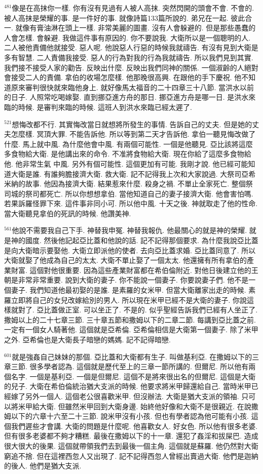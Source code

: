 \documentclass{book}
\begin{document}
$^{481}$像是在高抹你一樣.
你有沒有見過有人被人高抹.
突然閃開的頭會不會.
不會的.
被人高抹是榮耀的事.
是一件好的事.
就像詩篇133篇所說的.
弟兄在一起.
彼此合一.
就像有膏油淋在頭上一樣.
非常美麗的圖畫.
沒有人會躲避的.
但是那些愚蠢的人會怎樣.
會躲避.
我做這件事有原因的.
你不要說我.
大衛所以是一個聰明的人.
二人被他責備他就接受.
惡人呢.
他說惡人行惡的時候我就禱告.
有沒有見到大衛是多有智慧.
二人責備我接受.
惡人的行為對我的行為我就禱告.
所以我們見到其實.
我們接不接受人家的勸告.
反映出什麼.
反映出我們同神的關係.
一個淑齡的人絕對會接受二人的責備.
拿伯的收場怎麼樣.
他那晚很高興.
在跟他的手下慶祝.
他不知道原來審判很快就來臨他身上.
就好像馬太福音的二十四章三十八節.
當洪水以前的日子.
人照常吃喝嫁娶.
直到挪亞進方舟的那日.
挪亞進方舟是哪一日.
是洪水來臨的時候.
是審判來臨的時候.
這班人到洪水來臨已經太遲了.

$^{521}$想悔改都不行.
其實悔改當日就想將所發生的事情.
告訴自己的丈夫.
但是她的丈夫怎麼樣.
冥頂大罪.
不能告訴他.
所以等到第二天才告訴他.
拿伯一聽見悔改做了什麼.
馬上就中風.
為什麼他會中風.
有兩個可能性.
一個是他聽見.
亞比該將這麼多食物給大衛.
是他講出來的命令.
不准將食物給大衛.
現在你給了這麼多食物給他.
他非常生氣 中風.
另外有個可能性.
這個更加有可能.
我剛才說.
他已經可能知道大衛是誰.
有誰夠膽接濟大衛.
救大衛.
記不記得我上次和大家說過.
大祭司亞希米納的故事.
他因為接濟大衛.
結果惹來什麼.
殺身之禍.
不單止全家死亡.
整個祭司城的祭司都死亡.
所以你想想拿伯.
當他知道自己的妻子接濟大衛.
他會害怕嗎.
若果訴羅怪罪下來.
這件事非同小可.
所以他中風.
十天之後.
神就取走了他的性命.
當大衛聽見拿伯的死訊的時候.
他讚美神.

$^{561}$他說不需要我自己下手.
神替我申冤.
神替我報仇.
他最關心的就是神的榮耀.
就是神的國度.
然後他記起亞比蓋和他說的話.
記不記得那個要求.
為什麼我說亞比蓋是向大衛暗示要娶他.
大衛立即派他的使者.
去向亞比蓋求婚.
亞比蓋同意了.
所以大衛就娶了他成為自己的太太.
大衛不單止娶了一個太太.
他還擁有所有拿伯的產業財富.
這個對他很重要.
因為這些產業財富都在希伯倫附近.
對他日後建立他的王朝是非常非常重要.
說到大衛的妻子.
你不能說一個妻子.
你要說妻子們.
他不是一個妻子.
我們知道他最初娶的是誰.
是素羅的女米甲.
但當大衛離家出走的時候.
素羅立即將自己的女兒改嫁給別的男人.
所以現在米甲已經不是大衛的妻子.
你說這樣就對了.
亞比蓋做正室.
可以坐正了.
不是的.
似乎聖經告訴我們已經有人坐正了.
撒姆以上的二十七章三節.
三十章五節和撒姆以下的二章二節.
每講到亞比蓋之前.
一定有一個女人騎著他.
這個就是亞希倫.
亞希倫相信是大衛第一個妻子.
除了米甲之外.
亞希倫也是大衛長子暗戀的媽媽.
記不記得暗戀.

$^{601}$就是強姦自己妹妹的那個.
亞比蓋和大衛都有生子.
叫做基利亞.
在撒姆以下的三章三節.
很多學者認為.
這個就是歷代至上的三章一節所講的.
但爾尼.
所以他有兩個名字.
一個是基利亞.
一個是但爾尼.
這個不是將來很出名的但爾尼.
這個是大衛的兒子.
大衛在希伯倫統治猶大支派的時候.
他要求將米甲歸還給自己.
當時米甲已經嫁了另外一個人.
這個老公很喜歡米甲.
但沒辦法.
大衛是猶大支派的領袖.
只可以將米甲給大衛.
但雖然米甲回到大衛身邊.
始終他好像和大衛不是很親近.
在說撒姆以下的六章十六至二十三節.
說米甲沒有小孩.
但也有學者認為他可能有小孩.
這個我們遲些才會講.
大衛的問題是什麼呢.
他喜歡女人.
好女色.
所以他有很多老婆.
但有很多老婆都不夠才糟糕.
最後在撒姆以下的十一章.
還犯了姦淫和拔屎巴.
造成很大很大的後果.
這個就帶領我們去到最後一個主角.
這個就是蘇羅.
他仍然對大衛窮追不捨.
但在這裡西忽人又出現了.
記不記得西忽人曾經出賣過大衛.
他們是迦納的後人.
他們是猶大支派.
\end{document}
